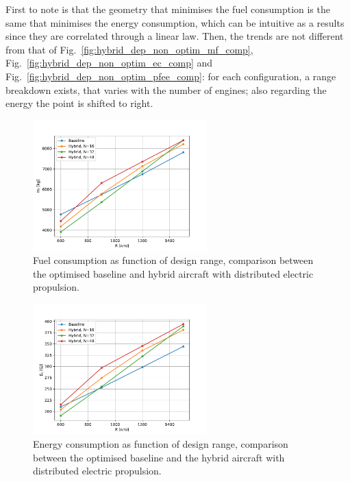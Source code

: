 First to note is that the geometry that minimises the fuel consumption is the same that minimises the energy consumption, which can be intuitive as a results since they are correlated through a linear law. 
Then, the trends are not different from that of Fig.~\ref{fig:hybrid_dep_non_optim_mf_comp}, Fig.~\ref{fig:hybrid_dep_non_optim_ec_comp} and Fig.~\ref{fig:hybrid_dep_non_optim_pfee_comp}: for each configuration, a range breakdown exists, that varies with the number of engines; also regarding the energy the point is shifted to right. 
\begin{figure}[!h]
	\centering
	\includegraphics[keepaspectratio, width=0.6\textwidth]{images/chap3/hybrid_dep_optim_mf_comp}
	\caption{Fuel consumption as function of design range, comparison between the optimised baseline and hybrid aircraft with distributed electric propulsion.}
	\label{fig:hybrid_dep_optim_mf_comp}
\end{figure}

\begin{figure}[!h]
	\centering
	\includegraphics[keepaspectratio, width=0.6\textwidth]{images/chap3/hybrid_dep_optim_ec_comp}
	\caption{Energy consumption as function of design range, comparison between the optimised baseline and the hybrid aircraft with distributed electric propulsion.}
	\label{fig:hybrid_dep_optim_ec_comp}
\end{figure}


